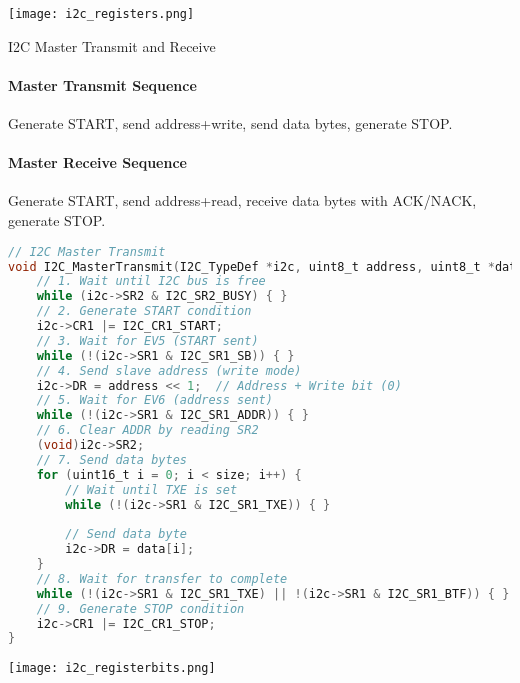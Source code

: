 \texttt{[image: i2c\_registers.png]}

\begin{KR}{I2C Master Transmit and Receive}
\paragraph{Master Transmit Sequence}
Generate START, send address+write, send data bytes, generate STOP.
\paragraph{Master Receive Sequence}
Generate START, send address+read, receive data bytes with ACK/NACK, generate STOP.

\begin{lstlisting}[language=C, style=basesmol]
// I2C Master Transmit
void I2C_MasterTransmit(I2C_TypeDef *i2c, uint8_t address, uint8_t *data, uint16_t size) {
    // 1. Wait until I2C bus is free
    while (i2c->SR2 & I2C_SR2_BUSY) { }
    // 2. Generate START condition
    i2c->CR1 |= I2C_CR1_START;
    // 3. Wait for EV5 (START sent)
    while (!(i2c->SR1 & I2C_SR1_SB)) { }
    // 4. Send slave address (write mode)
    i2c->DR = address << 1;  // Address + Write bit (0)
    // 5. Wait for EV6 (address sent)
    while (!(i2c->SR1 & I2C_SR1_ADDR)) { }
    // 6. Clear ADDR by reading SR2
    (void)i2c->SR2;
    // 7. Send data bytes
    for (uint16_t i = 0; i < size; i++) {
        // Wait until TXE is set
        while (!(i2c->SR1 & I2C_SR1_TXE)) { }
        
        // Send data byte
        i2c->DR = data[i];
    }
    // 8. Wait for transfer to complete
    while (!(i2c->SR1 & I2C_SR1_TXE) || !(i2c->SR1 & I2C_SR1_BTF)) { }
    // 9. Generate STOP condition
    i2c->CR1 |= I2C_CR1_STOP;
}
\end{lstlisting}
\end{KR}

\texttt{[image: i2c\_registerbits.png]}









